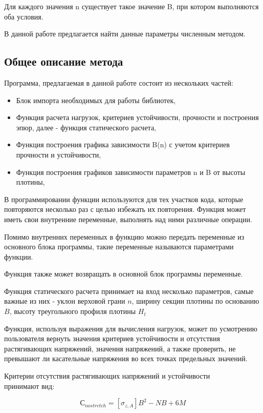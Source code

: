 \documentclass[12pt,a4paper,oneside,draft,titlepage]{article}
\begin{document}
Для каждого значения n существует такое значение B, при котором выполняются оба условия.

В данной работе предлагается найти данные параметры численным методом.

\subsection{Общее описание метода}

Программа, предлагаемая в данной работе состоит из нескольких частей:

\begin{itemize}
	\item Блок импорта необходимых для работы библиотек,
	\item Функция расчета нагрузок, критериев устойчивости, прочности и построения эпюр, далее - функция статического расчета,
	\item Функция построения графика зависимости B(n) с учетом критериев прочности и устойчивости,
	\item Функция построения графиков зависимости параметров n и B от высоты плотины,
\end{itemize}

В программировании функции используются для тех участков кода, которые повторяются несколько раз с целью избежать их повторения. Функция может иметь свои внутренние переменные, выполнять над ними различные операции.

Помимо внутренних переменных в функцию можно передать переменные из основного блока программы, такие переменные называются параметрами функции.

Функция также может возвращать в основной блок программы переменные.

Функция статического расчета принимает на вход несколько параметров, самые важные из них - уклон верховой грани $n$, ширину секции плотины по основанию $B$, высоту треугольного профиля плотины $H_t$

Функция, используя выражения для вычисления нагрузок, может по усмотрению пользователя вернуть значения критериев устойчивости и отсутствия растягивающих напряжений, значения напряжений, а также проверить, не превышают ли касательные напряжения во всех точках предельных значений.

Критерии отсутствия растягивающих напряжений и устойчивости \\
принимают вид:

$$ С_{nostretch} = [\sigma_{z,A}]  B ^ 2 - N  B + 6  M $$
\end{document}
